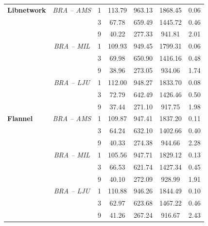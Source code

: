 \begin{appendices}
\begin{table}[!ht]
{\begin{tabular}{@{}lcccccc@{}}
\textbf{Libnetwork} & \textit{BRA – AMS} & 1 & 113.79 & 963.13 & 1868.45 & 0.06 \\
\textbf{} & \textit{} & 3 & 67.78 & 659.49 & 1445.72 & 0.46 \\
\textbf{} & \textit{} & 9 & 40.22 & 277.33 & 941.81 & 2.01 \\
\textbf{} & \textit{BRA – MIL} & 1 & 109.93 & 949.45 & 1799.31 & 0.06 \\
\textbf{} & \textit{} & 3 & 69.98 & 650.90 & 1416.16 & 0.48 \\
\textbf{} & \textit{} & 9 & 38.96 & 273.05 & 934.06 & 1.74 \\
\textbf{} & \textit{BRA – LJU} & 1 & 112.00 & 948.27 & 1833.70 & 0.08 \\
\textbf{} & \textit{} & 3 & 72.79 & 642.49 & 1426.46 & 0.50 \\
\textbf{} &  & 9 & 37.44 & 271.10 & 917.75 & 1.98 \\ \midrule
\textbf{Flannel} & \textit{BRA – AMS} & 1 & 109.87 & 947.41 & 1837.20 & 0.11 \\
\textbf{} & \textit{} & 3 & 64.24 & 632.10 & 1402.66 & 0.40 \\
\textbf{} & \textit{} & 9 & 40.33 & 274.38 & 944.66 & 2.28 \\
\textbf{} & \textit{BRA – MIL} & 1 & 105.56 & 947.71 & 1829.12 & 0.13 \\
\textbf{} & \textit{} & 3 & 66.53 & 621.74 & 1427.34 & 0.45 \\
\textbf{} & \textit{} & 9 & 40.10 & 272.09 & 928.99 & 1.91 \\
\textbf{} & \textit{BRA – LJU} & 1 & 110.88 & 946.26 & 1844.49 & 0.10 \\
\textbf{} & \textit{} & 3 & 62.97 & 623.68 & 1467.22 & 0.46 \\
\textbf{} &  & 9 & 41.26 & 267.24 & 916.67 & 2.43 \\ \midrule
\end{tabular}
}
\end{table}
  
\end{appendices}